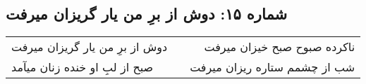 \begin{center}
\section*{شماره ۱۵: دوش از برِ من یار گریزان میرفت}
\label{sec:015}
\begin{longtable}{l p{0.5cm} r}
دوش از برِ من یار گریزان میرفت
&&
ناکرده صبوح صبح خیزان میرفت
\\
صبح از لبِ او خنده زنان میآمد
&&
شب از چشمم ستاره ریزان میرفت
\\
\end{longtable}
\end{center}
